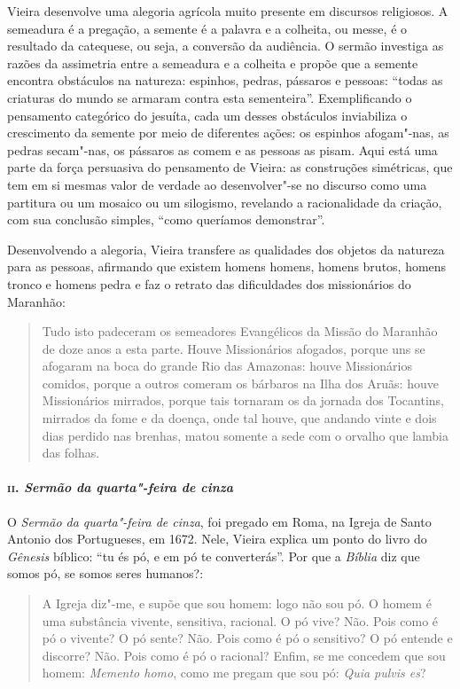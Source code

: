 Vieira desenvolve uma alegoria agrícola muito presente em discursos
religiosos. A semeadura é a pregação, a semente é a palavra e a
colheita, ou messe, é o resultado da catequese, ou seja, a conversão da
audiência. O sermão investiga as razões da assimetria entre a semeadura
e a colheita e propõe que a semente encontra obstáculos na natureza:
espinhos, pedras, pássaros e pessoas: ``todas as criaturas do mundo se
armaram contra esta sementeira''. Exemplificando o pensamento categórico
do jesuíta, cada um desses obstáculos inviabiliza o crescimento da
semente por meio de diferentes ações: os espinhos afogam"-nas, as pedras
secam"-nas, os pássaros as comem e as pessoas as pisam. Aqui está uma
parte da força persuasiva do pensamento de Vieira: as construções
simétricas, que tem em si mesmas valor de verdade ao desenvolver"-se no
discurso como uma partitura ou um mosaico ou um silogismo, revelando a
racionalidade da criação, com sua conclusão simples, ``como queríamos
demonstrar''.

Desenvolvendo a alegoria, Vieira transfere as qualidades dos objetos da
natureza para as pessoas, afirmando que existem homens homens, homens
brutos, homens tronco e homens pedra e faz o retrato das dificuldades
dos missionários do Maranhão:

\begin{quote}
Tudo isto padeceram os semeadores Evangélicos da Missão do Maranhão de
doze anos a esta parte. Houve Missionários afogados, porque uns se
afogaram na boca do grande Rio das Amazonas: houve Missionários comidos,
porque a outros comeram os bárbaros na Ilha dos Aruãs: houve
Missionários mirrados, porque tais tornaram os da jornada dos Tocantins,
mirrados da fome e da doença, onde tal houve, que andando vinte e dois
dias perdido nas brenhas, matou somente a sede com o orvalho que lambia
das folhas.
\end{quote}

\paragraph{\textsc{ii}. \emph{Sermão da quarta"-feira de cinza}}

O \emph{Sermão da quarta"-feira de cinza}, foi pregado em Roma, na Igreja
de Santo Antonio dos Portugueses, em 1672. Nele, Vieira explica um ponto
do livro do \emph{Gênesis} bíblico: ``tu és pó, e em pó te
converterás''. Por que a \emph{Bíblia} diz que somos pó, se somos seres
humanos?:

\begin{quote}
A Igreja diz"-me, e supõe que sou homem: logo não sou pó. O homem é uma
substância vivente, sensitiva, racional. O pó vive? Não. Pois como é pó
o vivente? O pó sente? Não. Pois como é pó o sensitivo? O pó entende e
discorre? Não. Pois como é pó o racional? Enfim, se me concedem que sou
homem: \emph{Memento homo}, como me pregam que sou pó: \emph{Quia pulvis
es}?
\end{quote}

